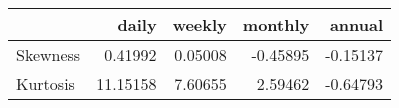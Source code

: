 \begin{tabular}{lrrrr}
\toprule
{} &     daily &   weekly &  monthly &   annual \\
\midrule
Skewness &   0.41992 &  0.05008 & -0.45895 & -0.15137 \\
Kurtosis &  11.15158 &  7.60655 &  2.59462 & -0.64793 \\
\bottomrule
\end{tabular}
